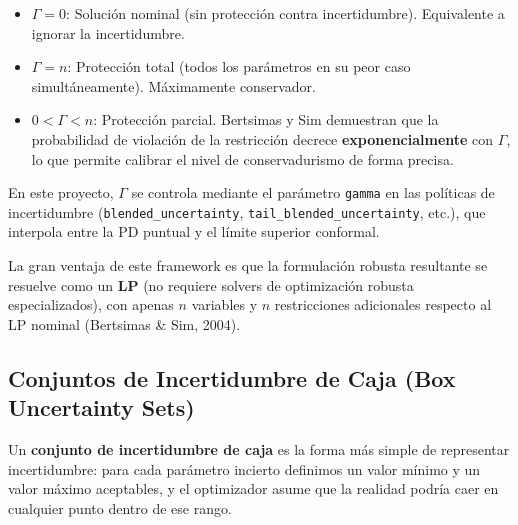 \documentclass[
  spanish,
  11pt,
  letterpaper,
]{scrbook}
\providecommand{\tightlist}{%
  \setlength{\itemsep}{0pt}\setlength{\parskip}{0pt}}
\theoremstyle{plain}
\theoremstyle{remark}
\begin{document}
\begin{tcolorbox}[enhanced jigsaw, arc=.35mm, bottomrule=.15mm, bottomtitle=1mm, breakable, colback=white, colbacktitle=quarto-callout-important-color!10!white, colframe=quarto-callout-important-color-frame, coltitle=black, left=2mm, leftrule=.75mm, opacityback=0, opacitybacktitle=0.6, rightrule=.15mm, title=\textcolor{quarto-callout-important-color}{\faExclamation}\hspace{0.5em}{Interpretación de \(\Gamma\)}, titlerule=0mm, toprule=.15mm, toptitle=1mm]

\begin{itemize}
\tightlist
\item
  \(\Gamma = 0\): Solución nominal (sin protección contra
  incertidumbre). Equivalente a ignorar la incertidumbre.
\item
  \(\Gamma = n\): Protección total (todos los parámetros en su peor caso
  simultáneamente). Máximamente conservador.
\item
  \(0 < \Gamma < n\): Protección parcial. Bertsimas y Sim demuestran que
  la probabilidad de violación de la restricción decrece
  \textbf{exponencialmente} con \(\Gamma\), lo que permite calibrar el
  nivel de conservadurismo de forma precisa.
\end{itemize}

En este proyecto, \(\Gamma\) se controla mediante el parámetro
\texttt{gamma} en las políticas de incertidumbre
(\texttt{blended\_uncertainty}, \texttt{tail\_blended\_uncertainty},
etc.), que interpola entre la PD puntual y el límite superior conformal.

\end{tcolorbox}

La gran ventaja de este framework es que la formulación robusta
resultante se resuelve como un \textbf{LP} (no requiere solvers de
optimización robusta especializados), con apenas \(n\) variables y \(n\)
restricciones adicionales respecto al LP nominal (Bertsimas \& Sim,
2004).

\subsection{Conjuntos de Incertidumbre de Caja (Box Uncertainty
Sets)}\label{sec-box-uncertainty}

Un \textbf{conjunto de incertidumbre de caja} es la forma más simple de
representar incertidumbre: para cada parámetro incierto definimos un
valor mínimo y un valor máximo aceptables, y el optimizador asume que la
realidad podría caer en cualquier punto dentro de ese rango.
\end{document}
